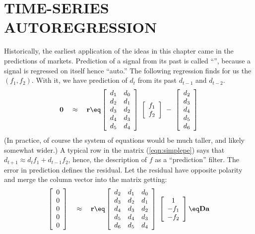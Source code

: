 \section{TIME-SERIES AUTOREGRESSION}
Historically, the earliest application of the ideas in this chapter
came in the predictions of markets.
Prediction of a signal from its past is called ``'',
because a signal is regressed on itself hence ``auto.''
The following regression finds for us
the  $(f_1,f_2)$.
With it,
we have prediction of $d_{t}$
from its past
$d_{t-1}$ and
$d_{t-2}$.
\begin{equation}
\bold 0
\quad \approx \quad
\bold r \eq
\left[ 
\begin{array}{ccc}
  d_1 & d_0 \\
  d_2 & d_1  \\
  d_3 & d_2  \\
  d_4 & d_3  \\
  d_5 & d_4  \end{array} \right] 
\; \left[ 
\begin{array}{c}
  f_1 \\ 
  f_2 \end{array} \right]
\ -\ 
\left[ 
\begin{array}{c}
  d_2 \\ 
  d_3 \\ 
  d_4 \\ 
  d_5 \\ 
  d_6 \end{array} \right] 
  \label{eqn:simplepe}
\end{equation}
(In practice, of course the system of equations would be
much taller, and likely somewhat wider.)
A typical row in the matrix (\ref{eqn:simplepe})
says that $d_{t+1} \approx d_t f_1 + d_{t-1} f_2$,
hence,
the description of $f$ as a ``prediction'' filter.
The error in prediction defines the residual.
Let the residual have opposite polarity
and merge the column vector into the matrix getting:
\begin{equation}
\left[ 
\begin{array}{c}
  0 \\ 
  0 \\ 
  0 \\ 
  0 \\ 
  0 \end{array} \right] 
\quad \approx \quad
\bold r \eq
\left[ 
\begin{array}{ccc}
  d_2 & d_1 & d_0 \\
  d_3 & d_2 & d_1  \\
  d_4 & d_3 & d_2  \\
  d_5 & d_4 & d_3  \\
  d_6 & d_5 & d_4  \end{array} \right] 
\; \left[ 
\begin{array}{c}
  1 \\ 
  -f_1 \\ 
  -f_2 \end{array} \right]
  \eq \bold D \bold a
  \label{eqn:simplepef}
\end{equation}
